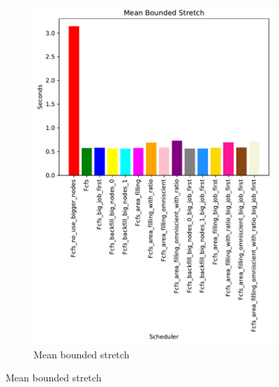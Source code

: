\documentclass[a4paper]{article}
\begin{document}
\begin{figure}[H]
\begin{subfigure}[b]{0.4\linewidth}\centering\includegraphics[width=1\linewidth]{MBSS/plot/Size_Constraint_2022-01-24->2022-01-24_Mean_Stretch_With_a_Minimum_162_128_162_256_162_1024.pdf}\caption{Mean bounded stretch}\label{10}\end{subfigure}

\end{figure}
\end{document}
